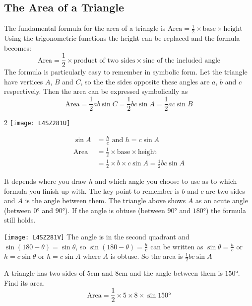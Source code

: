  

\subsection*{The Area of a Triangle}
The fundamental formula for the area of a triangle is $\text{Area} =\frac{1}{2} \times \text{base} \times \text{height}$ Using the trigonometric functions the height can be replaced and the formula becomes:
\begin{equation*}\text{Area} =\frac{1}{2} \times \text{product of two sides} \times \text{sine of the included angle}
\end{equation*}
The formula is particularly easy to remember in symbolic form. Let the triangle have vertices $A$, $B$ and $C$, so the the sides opposite these angles are $a$, $b$ and $c$ respectively. Then the area can be expressed symbolically as
\begin{equation*}\text{Area} =\frac{1}{2} a b \sin  C =\frac{1}{2} b c \sin  A =\frac{1}{2} a c \sin  B
\end{equation*}

\columnsep =30pt
\begin {multicols}{2} 
\texttt{[image: L4SZ281U]}

\begin{align*}\sin  A &  = \frac{h}{c}\text{ and }h =c \sin  A \\
\text{Area} &  =  \frac{1}{2} \times \text{base} \times \text{height} \\
 &  =  \frac{1}{2} \times b \times c \sin  A =\frac{1}{2} b c \sin  A
 \end{align*}
\end {multicols}
It depends where you draw $h$ and which angle you choose to use as to which formula you finish up with. The key point to remember is $b$ and $c$ are two sides and $A$ is the angle between them. The triangle above shows $A$ as an acute angle (between $\ang{0}$ and $\ang{90} $). If the angle is obtuse (between $\ang{90} $ and $\ang{180} $) the formula still holds. 
\begin{multicols}{2}
\texttt{[image: L4SZ281V]}
The angle is in the second quadrant and $\sin  (180 -\theta ) =\sin  \theta $, so $\sin  (180 -\theta ) =\frac{h}{c}$ can be written as $\sin  \theta  =\frac{h}{c}$ or $h =c \sin  \theta $ or $h =c \sin  A$ where $A$ is obtuse. So the area is $\frac{1}{2} b c \sin  A$ 
\end{multicols}
\clearpage
\example A triangle has two sides of $5 \mbox{cm}$ and $8 \mbox{cm}$ and the angle between them is $\ang{150} $. Find its area.\medskip\\
\solution
\begin{equation*}\text{Area} =\frac{1}{2} \times 5 \times 8 \times \sin  \ang{150} 
\end{equation*}

